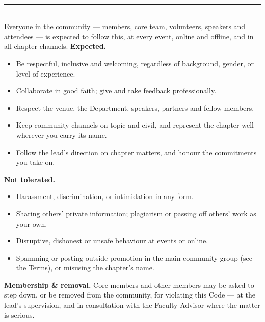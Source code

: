\documentclass[11pt,a4paper]{article}
\newcommand{\pill}[2]{\tikz[baseline]{\node[fill=#1,text=white,font=\bfseries\small,%
  rounded corners=3pt,inner xsep=7pt,inner ysep=2.5pt]{#2};}}
\begin{document}
\begin{tcolorbox}[enhanced,breakable,colback=white,colframe=Line,boxrule=0.6pt,arc=5pt,
    left=14pt,right=14pt,top=12pt,bottom=12pt,borderline west={3.5pt}{0pt}{GGrn},
    before skip=8pt,after skip=12pt]
  {\pill{GGrn}{04}}\;\\[8pt]
  {\color{Line}\rule{\linewidth}{0.5pt}}\\[7pt]
  
Everyone in the community — members, core team, volunteers, speakers and attendees — is expected to
follow this, at every event, online and offline, and in all chapter channels.
\vspace{2pt}
{\bfseries\color{GGrn}Expected.}
\begin{itemize}[leftmargin=1.4em,itemsep=2pt,topsep=1pt]
  \item Be respectful, inclusive and welcoming, regardless of background, gender, or level of
        experience.
  \item Collaborate in good faith; give and take feedback professionally.
  \item Respect the venue, the Department, speakers, partners and fellow members.
  \item Keep community channels on-topic and civil, and represent the chapter well wherever you carry
        its name.
  \item Follow the lead's direction on chapter matters, and honour the commitments you take on.
\end{itemize}
{\bfseries\color{GRed}Not tolerated.}
\begin{itemize}[leftmargin=1.4em,itemsep=2pt,topsep=1pt]
  \item Harassment, discrimination, or intimidation in any form.
  \item Sharing others' private information; plagiarism or passing off others' work as your own.
  \item Disruptive, dishonest or unsafe behaviour at events or online.
  \item Spamming or posting outside promotion in the main community group (see the Terms), or misusing
        the chapter's name.
\end{itemize}
{\bfseries\color{Ink}Membership \& removal.}\;
Core members and other members may be asked to step down, or be removed from the community, for
violating this Code — at the lead's supervision, and in consultation with the Faculty Advisor where
the matter is serious.
\vspace{3pt}\\

\end{tcolorbox}
\end{document}
